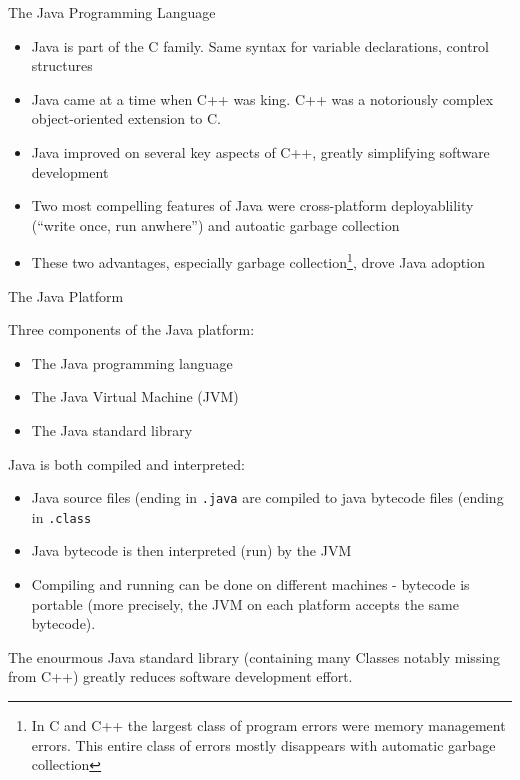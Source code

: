 \documentclass{beamer}
\begin{document}
\begin{frame}[fragile]{The Java Programming Language}


\begin{itemize}
\item Java is part of the C family.  Same syntax for variable
  declarations, control structures
\item Java came at a time when C++ was king.  C++ was a notoriously complex
  object-oriented extension to C.
\item Java improved on several key aspects of C++, greatly simplifying
  software development
\item Two most compelling features of Java were cross-platform
  deployablility (``write once, run anwhere'') and autoatic garbage
  collection
\item These two advantages, especially garbage collection\footnote{In
    C and C++ the largest class of program errors were memory
    management errors.  This entire class of errors mostly disappears
    with automatic garbage collection}, drove Java adoption
\end{itemize}

\end{frame}

\begin{frame}[fragile]{The Java Platform}


Three components of the Java platform:
\begin{itemize}
\item The Java programming language
\item The Java Virtual Machine (JVM)
\item The Java standard library
\end{itemize}
Java is both compiled and interpreted:
\begin{itemize}
\item Java source files (ending in {\tt .java} are compiled to java
  bytecode files (ending in {\tt .class}
\item Java bytecode is then interpreted (run) by the JVM
\item Compiling and running can be done on different machines -
  bytecode is portable (more precisely, the JVM on each platform
  accepts the same bytecode).
\end{itemize}
The enourmous Java standard library (containing many Classes notably
missing from C++) greatly reduces software development effort.
\end{frame}
\end{document}
